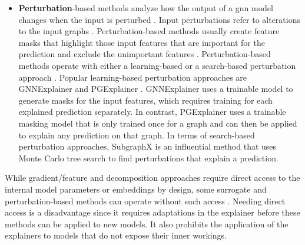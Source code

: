 \begin{itemize}
    \item \textbf{Perturbation}-based methods analyze how the output of a \gls{gnn} model changes when the input is perturbed \cite{yuan_explainability_2020}. Input perturbations refer to alterations to the input graphs \cite{yuan_explainability_2020}. Perturbation-based methods usually create feature masks that highlight those input features that are important for the prediction and exclude the unimportant features \cite{yuan_explainability_2020, ivanovs_perturbation-based_2021}. Perturbation-based methods operate with either a learning-based or a search-based perturbation approach \cite{xia_explaining_2023}. Popular learning-based perturbation approaches are GNNExplainer \cite{ying_gnnexplainer_2019} and PGExplainer \cite{luo_parameterized_2020}. GNNExplainer \cite{ying_gnnexplainer_2019} uses a trainable model to generate masks for the input features, which requires training for each explained prediction separately. In contrast, PGExplainer \cite{luo_parameterized_2020} uses a trainable masking model that is only trained once for a graph and can then be applied to explain any prediction on that graph. In terms of search-based perturbation approaches, SubgraphX \cite{yuan_explainability_2021} is an influential method that uses Monte Carlo tree search to find perturbations that explain a prediction.
\end{itemize}

While gradient/feature and decomposition approaches require direct access to the internal model parameters or embeddings by design, some surrogate and perturbation-based methods can operate without such access \cite{kakkad_survey_2023}. Needing direct access is a disadvantage since it requires adaptations in the explainer before these methods can be applied to new models. It also prohibits the application of the explainers to models that do not expose their inner workings.


